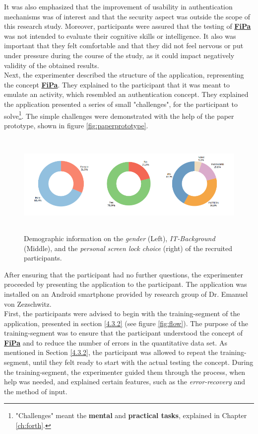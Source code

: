 It was also emphasized that the improvement of usability in authentication mechanisms was of interest and that the security aspect was outside the scope of this research study. Moreover, participants were assured that the testing of \underline{\textbf{FiPa}} was not intended to evaluate their cognitive skills or intelligence. It also was important that they felt comfortable and that they did not feel nervous or put under pressure during the course of the study, as it could impact negatively validity of the obtained results.\\

Next, the experimenter described the structure of the application, representing the concept \underline{\textbf{FiPa}}. They explained to the participant that it was meant to emulate an activity, which resembled an authentication concept. They explained the application presented a series of small "challenges", for the participant to solve\footnote{"Challenges"  meant the \textbf{mental} and \textbf{practical tasks}, explained in Chapter \ref{ch:forth}.}. The simple challenges were demonstrated with the help of the paper prototype, shown in figure \ref{fig:paperprototype}.\\

\begin{figure}[t!]
\centering
\includegraphics[width=15cm, height=5cm]{Chapters/graphics/Demos.PNG}
\caption{Demographic information on the \textit{gender} (Left), \textit{IT-Background} (Middle), and the \textit{personal screen lock choice} (right) of the recruited participants.}
\label{fig:demo}
\end{figure}

After ensuring that the participant had no further questions, the experimenter proceeded by presenting the application to the participant. The application was installed on an Android smartphone provided by research group of Dr. Emanuel von Zezschwitz.\\
First, the participants were advised to begin with the training-segment of the application, presented in section \ref{4.3.2} (see figure \ref{fig:flow}). The purpose of the training-segment was to ensure that the participant understood the concept of \underline{\textbf{FiPa}} and to reduce the number of errors in the quantitative data set. As mentioned in Section \ref{4.3.2}, the participant was allowed to repeat the training-segment, until they felt ready to start with the actual testing the concept. During the training-segment, the experimenter guided them through the process, when help was needed, and explained certain features, such as the \textit{error-recovery} and the method of input. \\

